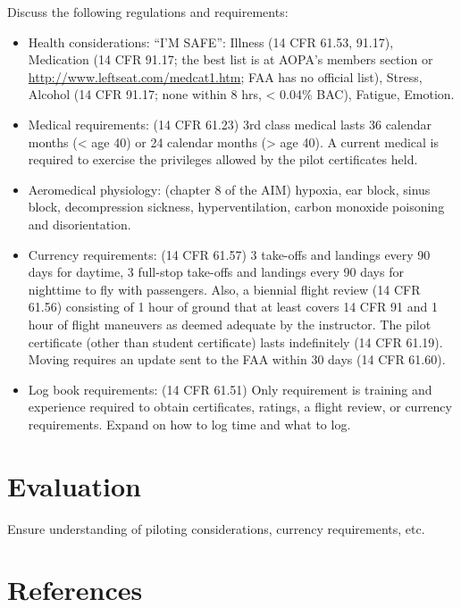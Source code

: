 \documentclass[twoside,openright]{report}
\begin{document}
Discuss the following regulations and requirements:

\begin{itemize}
  \item Health considerations: ``I'M SAFE'': Illness (14 CFR 61.53, 91.17),
    Medication (14 CFR 91.17; the best list is at AOPA's members section or
    \url{http://www.leftseat.com/medcat1.htm}; FAA has no official list),
    Stress, Alcohol (14 CFR 91.17; none within 8 hrs, < 0.04\% BAC), Fatigue,
    Emotion.

  \item Medical requirements: (14 CFR 61.23) 3rd class medical lasts 36
    calendar months (< age 40) or 24 calendar months (> age 40). A current
    medical is required to exercise the privileges allowed by the pilot
    certificates held.

  \item Aeromedical physiology: (chapter 8 of the AIM) hypoxia, ear block,
    sinus block, decompression sickness, hyperventilation, carbon monoxide
    poisoning and disorientation.

  \item Currency requirements: (14 CFR 61.57) 3 take-offs and landings every 90
    days for daytime, 3 full-stop take-offs and landings every 90 days for
    nighttime to fly with passengers. Also, a biennial flight review (14 CFR
    61.56) consisting of 1 hour of ground that at least covers 14 CFR 91 and 1
    hour of flight maneuvers as deemed adequate by the instructor. The pilot
    certificate (other than student certificate) lasts indefinitely (14 CFR
    61.19). Moving requires an update sent to the FAA within 30 days (14 CFR
    61.60).

  \item Log book requirements: (14 CFR 61.51) Only requirement is training and
    experience required to obtain certificates, ratings, a flight review, or
    currency requirements. Expand on how to log time and what to log.

\end{itemize}

\section{Evaluation}

Ensure understanding of piloting considerations, currency requirements, etc.

\section{References}
\end{document}
